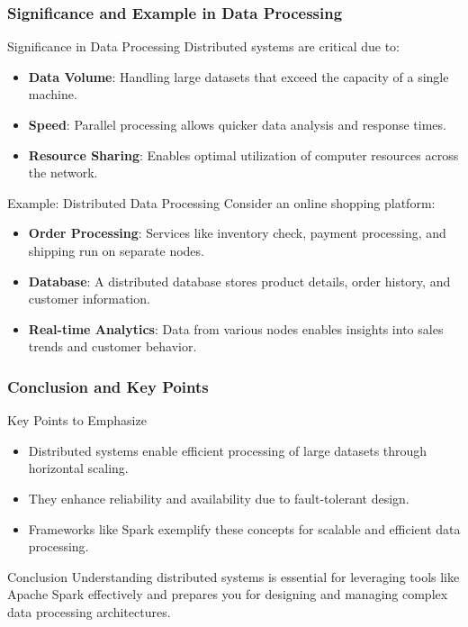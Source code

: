 \documentclass[aspectratio=169]{beamer}
\begin{document}
\begin{frame}[fragile]
  \frametitle{Significance and Example in Data Processing}
  \begin{block}{Significance in Data Processing}
    Distributed systems are critical due to:
    \begin{itemize}
      \item \textbf{Data Volume}: Handling large datasets that exceed the capacity of a single machine.
      \item \textbf{Speed}: Parallel processing allows quicker data analysis and response times.
      \item \textbf{Resource Sharing}: Enables optimal utilization of computer resources across the network.
    \end{itemize}
  \end{block}
  
  \begin{block}{Example: Distributed Data Processing}
    Consider an online shopping platform:
    \begin{itemize}
      \item \textbf{Order Processing}: Services like inventory check, payment processing, and shipping run on separate nodes.
      \item \textbf{Database}: A distributed database stores product details, order history, and customer information.
      \item \textbf{Real-time Analytics}: Data from various nodes enables insights into sales trends and customer behavior.
    \end{itemize}
  \end{block}
\end{frame}

\begin{frame}[fragile]
  \frametitle{Conclusion and Key Points}
  \begin{block}{Key Points to Emphasize}
    \begin{itemize}
      \item Distributed systems enable efficient processing of large datasets through horizontal scaling.
      \item They enhance reliability and availability due to fault-tolerant design.
      \item Frameworks like Spark exemplify these concepts for scalable and efficient data processing.
    \end{itemize}
  \end{block}
  
  \begin{block}{Conclusion}
   Understanding distributed systems is essential for leveraging tools like Apache Spark effectively and prepares you for designing and managing complex data processing architectures.
  \end{block}
\end{frame}
\end{document}
